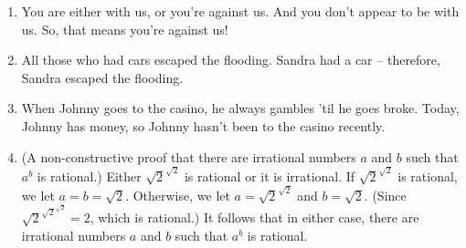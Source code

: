 \begin{enumerate}
\begin{enumerate}
\item \rule{0pt}{24pt} You are either with us, or you're against us.  And you don't appear to be with us.
So, that means you're against us!
\item \rule{0pt}{24pt} All those who had cars escaped the flooding.  Sandra had a car -- therefore, Sandra
escaped the flooding.
\item \rule{0pt}{24pt}  When Johnny goes to the casino, he always gambles 'til he goes broke.  Today, Johnny
has money, so Johnny hasn't been to the casino recently.
\item \rule{0pt}{24pt} (A non-constructive proof that there are 
irrational numbers $a$ and $b$ such that $a^b$ is rational.)  
Either $\sqrt{2}^{\sqrt{2}}$ is rational or it is irrational.
If $\sqrt{2}^{\sqrt{2}}$ is rational, we let $a=b=\sqrt{2}$.
Otherwise, we let $a=\sqrt{2}^{\sqrt{2}}$ and $b=\sqrt{2}$.
(Since $\sqrt{2}^{\sqrt{2}^{\sqrt{2}}} = 2$, which is rational.) It follows that in either case, there
are irrational numbers $a$ and $b$ such that $a^b$ is rational.
\end{enumerate}

\end{enumerate}